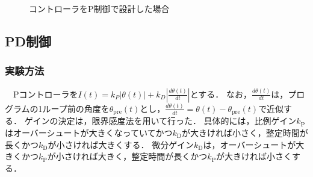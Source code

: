 \begin{figure}[h]
\begin{minipage}{0.43\columnwidth}
	  \label{fig:Pdegpers}
	\end{minipage}
	\caption{コントローラをP制御で設計した場合}
	\label{fig:P}
  \end{figure}

\subsection{PD制御}
\subsubsection{実験方法}
　Pコントローラを$I(t) = k_P |\theta(t)| + k_D|\frac{d\theta(t)}{dt}|$とする．
なお，$\frac{d\theta(t)}{dt}$は，プログラムの1ループ前の角度を$\theta_\mathrm{pre}(t)$とし，$\frac{d\theta(t)}{dt} = \theta(t)-\theta_\mathrm{pre}(t)$で近似する．
ゲインの決定は，限界感度法を用いて行った．
具体的には，比例ゲイン$k_\mathrm{P}$はオーバーシュートが大きくなっていてかつ$k_\mathrm{D}$が大きければ小さく，整定時間が長くかつ$k_\mathrm{D}$が小さければ大きくする．
微分ゲイン$k_\mathrm{D}$は，オーバーシュートが大きくかつ$k_\mathrm{P}$が小さければ大きく，整定時間が長くかつ$k_\mathrm{P}$が大きければ小さくする．
